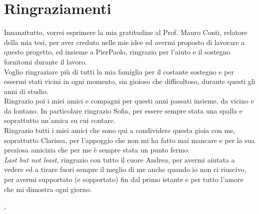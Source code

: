 
\cleardoublepage
{}
{}



\bigskip

\begingroup
\let\clearpage\relax
\let\cleardoublepage\relax
\let\cleardoublepage\relax

\chapter*{Ringraziamenti}

\noindent Innanzitutto, vorrei esprimere la mia gratitudine al Prof. Mauro Conti, relatore della mia tesi, per aver creduto nelle mie idee ed avermi proposto di lavorare a questo progetto, ed insieme a PierPaolo, ringrazio per l'aiuto e il sostegno fornitomi durante il lavoro.\\

\noindent Voglio ringraziare più di tutti la mia famiglia per il costante sostegno e per essermi stati vicini in ogni momento, sia gioioso che difficoltoso, durante questi gli anni di studio.\\

\noindent Ringrazio poi i miei amici e compagni per questi anni passati insieme, da vicino e da lontano. In particolare ringrazio Sofia, per essere sempre stata una spalla e soprattutto un'amica su cui contare.\\

\noindent Ringrazio tutti i miei amici che sono qui a condividere questa gioia con me, soprattutto Clarissa, per l'appoggio che non mi ha fatto mai mancare e per la sua preziosa amicizia che per me è sempre stata un punto fermo.\\

\noindent \textit{Last but not least}, ringrazio con tutto il cuore Andrea, per avermi aiutata a vedere ed a tirare fuori sempre il meglio di me anche quando io non ci riuscivo, per avermi supportato (e sopportato) fin dal primo istante e per tutto l'amore che mi dimostra ogni giorno.\\
\bigskip

\noindent\textit{\myLocation, \myTime}
\hfill \myName

\endgroup

